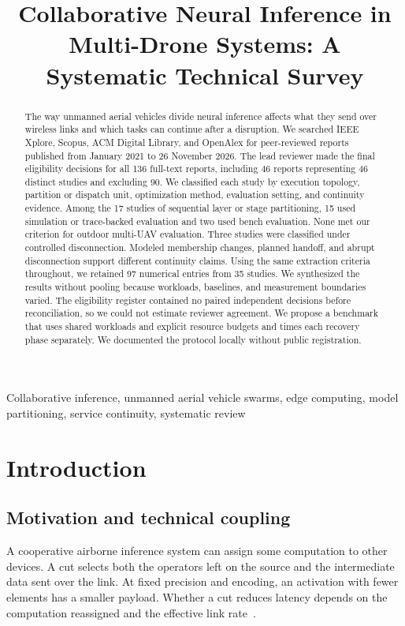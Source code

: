 \documentclass[journal]{IEEEtran}
\begin{document}
\title{Collaborative Neural Inference in Multi-Drone Systems: A Systematic Technical Survey}
\maketitle

\begin{abstract}
The way unmanned aerial vehicles divide neural inference affects what they send over wireless links and which tasks can continue after a disruption. We searched IEEE Xplore, Scopus, ACM Digital Library, and OpenAlex for peer-reviewed reports published from January 2021 to 26 November 2026. The lead reviewer made the final eligibility decisions for all 136 full-text reports, including 46 reports representing 46 distinct studies and excluding 90. We classified each study by execution topology, partition or dispatch unit, optimization method, evaluation setting, and continuity evidence. Among the 17 studies of sequential layer or stage partitioning, 15 used simulation or trace-backed evaluation and two used bench evaluation. None met our criterion for outdoor multi-UAV evaluation. Three studies were classified under controlled disconnection. Modeled membership changes, planned handoff, and abrupt disconnection support different continuity claims. Using the same extraction criteria throughout, we retained 97 numerical entries from 35 studies. We synthesized the results without pooling because workloads, baselines, and measurement boundaries varied. The eligibility register contained no paired independent decisions before reconciliation, so we could not estimate reviewer agreement. We propose a benchmark that uses shared workloads and explicit resource budgets and times each recovery phase separately. We documented the protocol locally without public registration.
\end{abstract}

\begin{IEEEkeywords}
Collaborative inference, unmanned aerial vehicle swarms, edge computing, model partitioning, service continuity, systematic review
\end{IEEEkeywords}

\section{Introduction}\label{sec:intro}
\subsection{Motivation and technical coupling}
A cooperative airborne inference system can assign some computation to other devices. A cut selects both the operators left on the source and the intermediate data sent over the link. At fixed precision and encoding, an activation with fewer elements has a smaller payload. Whether a cut reduces latency depends on the computation reassigned and the effective link rate~\cite{R0001,R0010,R0092,R0121}.
\end{document}
